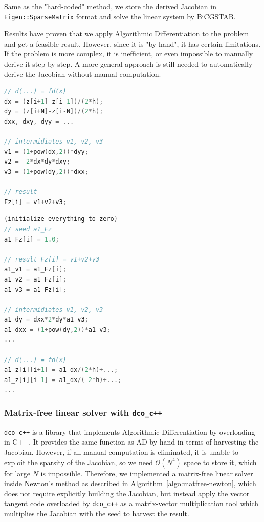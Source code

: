 \documentclass[11pt]{scrartcl}
\begin{document}
Same as the "hard-coded" method, we store the derived Jacobian in \texttt{Eigen::SparseMatrix} format and solve the linear system by BiCGSTAB.

Results have proven that we apply Algorithmic Differentiation to the problem and get a feasible result. However, since it is "by hand", it has certain limitations. If the problem is more complex, it is inefficient, or even impossible to manually derive it step by step. A more general approach is still needed to automatically derive the Jacobian without manual computation.


\noindent
\begin{minipage}[t]{0.45\linewidth}
\begin{lstlisting}[caption={Adjoint SAC Code for inner gridpoint $i$ (primal/forward)},label=lst:prsac,language=C++]
// d(...) = fd(x)
dx = (z[i+1]-z[i-1])/(2*h);
dy = (z[i+N]-z[i-N])/(2*h);
dxx, dxy, dyy = ...

// intermidiates v1, v2, v3
v1 = (1+pow(dx,2))*dyy;
v2 = -2*dx*dy*dxy;
v3 = (1+pow(dy,2))*dxx;

// result
Fz[i] = v1+v2+v3;
\end{lstlisting}
\end{minipage}\hfill
\begin{minipage}[t]{0.53\linewidth}
\begin{lstlisting}[caption={Adjoint SAC Code for inner gridpoint $i$ (adjoint/reverse)},label=lst:adsac,language=C++]
(initialize everything to zero)
// seed a1_Fz
a1_Fz[i] = 1.0;

// result Fz[i] = v1+v2+v3
a1_v1 = a1_Fz[i];
a1_v2 = a1_Fz[i];
a1_v3 = a1_Fz[i];

// intermidiates v1, v2, v3
a1_dy = dxx*2*dy*a1_v3;
a1_dxx = (1+pow(dy,2))*a1_v3;
...

// d(...) = fd(x)
a1_z[i][i+1] = a1_dx/(2*h)+...;
a1_z[i][i-1] = a1_dx/(-2*h)+...;
...
\end{lstlisting}
\end{minipage}

\subsubsection{Matrix-free linear solver with \texttt{dco\_c++}}
\texttt{dco\_c++} is a library that implements Algorithmic Differentiation by overloading in C++. It provides the same function as AD by hand in terms of harvesting the Jacobian. However, if all manual computation is eliminated, it is unable to exploit the sparsity of the Jacobian, so we need $\mathcal{O}(N^4)$ space to store it, which for large $N$ is impossible. Therefore, we implemented a matrix-free linear solver inside Newton's method as described in Algorithm~\ref{algo:matfree-newton}, which does not require explicitly building the Jacobian, but instead apply the vector tangent code overloaded by \texttt{dco\_c++} as a matrix-vector multiplication tool which multiplies the Jacobian with the seed to harvest the result.
\end{document}
